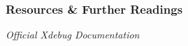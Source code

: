 \begin{frame}\frametitle{Resources \& Further Readings}
    \begin{thebibliography}{10}
    \bibitem \emph{Official Xdebug Documentation} 
    \end{thebibliography}
\end{frame}
